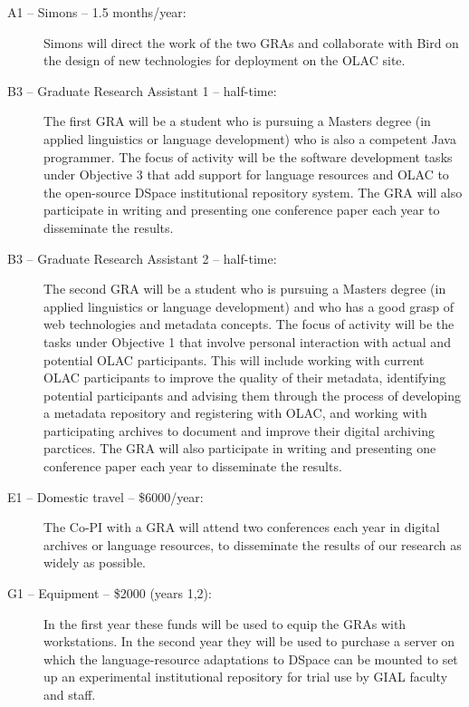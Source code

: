 \documentclass[11pt]{nsf}
\begin{document}
\begin{description}
\item[A1 -- Simons -- 1.5 months/year:]
Simons will direct the work of the two GRAs and collaborate with Bird
on the design of new technologies for deployment on the OLAC site.

\item[B3 -- Graduate Research Assistant 1 -- half-time:]
The first GRA will be a student who is pursuing a Masters degree (in 
applied linguistics or language development) who is also
a competent Java programmer. The focus of activity will be
the software development tasks under Objective 3 that add
support for language resources and OLAC to the open-source DSpace
institutional repository system. The GRA will also participate
in writing and presenting one conference paper each year
to disseminate the results.

\item[B3 -- Graduate Research Assistant 2 -- half-time:]
The second GRA will be a student who is pursuing a Masters degree (in 
applied linguistics or language development) and who has a good grasp of web technologies and
metadata concepts. The focus of activity will be
the tasks under Objective 1 that involve personal interaction
with actual and potential OLAC participants.  This will include
working with current OLAC participants to improve the quality of their
metadata, identifying potential participants and advising
them through the process of developing a metadata repository and registering with
OLAC, and working with participating archives to document
and improve their digital archiving parctices. The GRA will also participate
in writing and presenting one conference paper each year
to disseminate the results.

\item[E1 -- Domestic travel -- \$6000/year:]
The Co-PI with a GRA will attend two conferences each year in digital archives or
language resources, to disseminate the results of our research as
widely as possible.

\item[G1 -- Equipment -- \$2000 (years 1,2):]
In the first year these funds will be used
to equip the GRAs with workstations.  In the second year they will
be used to purchase a server on which the language-resource adaptations to
DSpace can be mounted to set up an experimental institutional repository
for trial use by GIAL faculty and staff.
\end{description}
\end{document}
